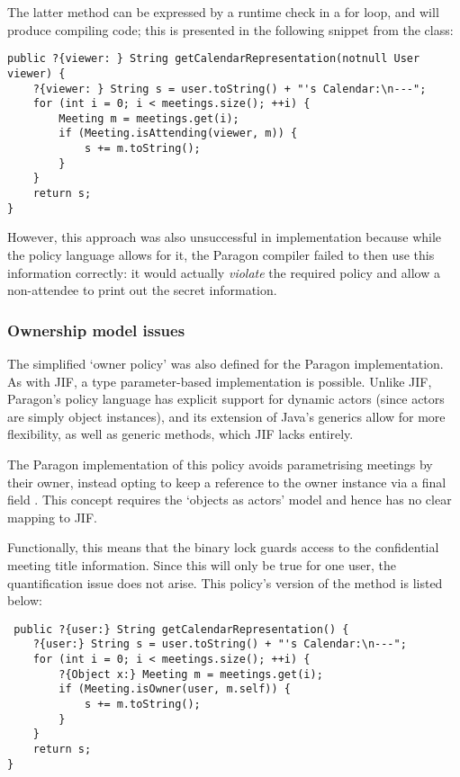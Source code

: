The latter method can be expressed by a runtime check in a for loop, and will produce compiling code; this is presented in the following snippet from the  class:

\begin{verbatim}
public ?{viewer: } String getCalendarRepresentation(notnull User viewer) {
	?{viewer: } String s = user.toString() + "'s Calendar:\n---";
	for (int i = 0; i < meetings.size(); ++i) {
		Meeting m = meetings.get(i);
		if (Meeting.isAttending(viewer, m)) {
			s += m.toString();
		}
	}
	return s;
}
\end{verbatim}

However, this approach was also unsuccessful in implementation because while the policy language allows for it, the Paragon compiler failed to then use this information correctly: it would actually \textit{violate} the required policy and allow a non-attendee to print out the secret information.


\subsubsection{Ownership model issues}

The simplified `owner policy' was also defined for the Paragon implementation. As with JIF, a type parameter-based implementation is possible. Unlike JIF, Paragon's policy language has explicit support for dynamic actors (since actors are simply object instances), and its extension of Java's generics allow for more flexibility, as well as generic methods, which JIF lacks entirely.

The Paragon implementation of this policy avoids parametrising meetings by their owner, instead opting to keep a reference to the owner instance via a final field . This concept requires the `objects as actors' model and hence has no clear mapping to JIF.

Functionally, this means that the binary lock  guards access to the confidential meeting title information. Since this will only be true for one user, the quantification issue does not arise. This policy's version of the  method is listed below:

\begin{verbatim}
 public ?{user:} String getCalendarRepresentation() {
	?{user:} String s = user.toString() + "'s Calendar:\n---";
	for (int i = 0; i < meetings.size(); ++i) {
		?{Object x:} Meeting m = meetings.get(i);
		if (Meeting.isOwner(user, m.self)) {
			s += m.toString();
		}
	}
	return s;
}
\end{verbatim}


